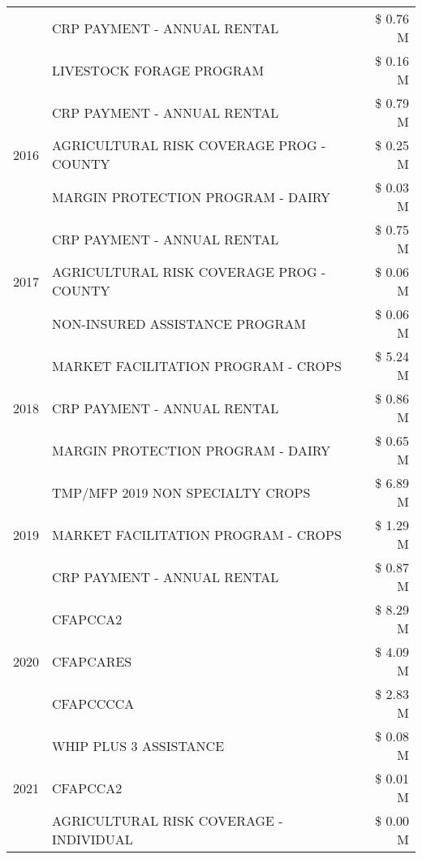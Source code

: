 \begin{tabular}{llr}
 & CRP PAYMENT - ANNUAL RENTAL & \$ 0.76 M \\
 & LIVESTOCK FORAGE PROGRAM & \$ 0.16 M \\
\cline{1-3}
\multirow[t]{3}{*}{2016} & CRP PAYMENT - ANNUAL RENTAL & \$ 0.79 M \\
 & AGRICULTURAL RISK COVERAGE PROG - COUNTY & \$ 0.25 M \\
 & MARGIN PROTECTION PROGRAM - DAIRY & \$ 0.03 M \\
\cline{1-3}
\multirow[t]{3}{*}{2017} & CRP PAYMENT - ANNUAL RENTAL & \$ 0.75 M \\
 & AGRICULTURAL RISK COVERAGE PROG - COUNTY & \$ 0.06 M \\
 & NON-INSURED ASSISTANCE PROGRAM & \$ 0.06 M \\
\cline{1-3}
\multirow[t]{3}{*}{2018} & MARKET FACILITATION PROGRAM - CROPS & \$ 5.24 M \\
 & CRP PAYMENT - ANNUAL RENTAL & \$ 0.86 M \\
 & MARGIN PROTECTION PROGRAM - DAIRY & \$ 0.65 M \\
\cline{1-3}
\multirow[t]{3}{*}{2019} & TMP/MFP 2019 NON SPECIALTY CROPS & \$ 6.89 M \\
 & MARKET FACILITATION PROGRAM - CROPS & \$ 1.29 M \\
 & CRP PAYMENT - ANNUAL RENTAL & \$ 0.87 M \\
\cline{1-3}
\multirow[t]{3}{*}{2020} & CFAPCCA2 & \$ 8.29 M \\
 & CFAPCARES & \$ 4.09 M \\
 & CFAPCCCCA & \$ 2.83 M \\
\cline{1-3}
\multirow[t]{3}{*}{2021} & WHIP PLUS 3 ASSISTANCE & \$ 0.08 M \\
 & CFAPCCA2 & \$ 0.01 M \\
 & AGRICULTURAL RISK COVERAGE - INDIVIDUAL & \$ 0.00 M \\
\cline{1-3}
\bottomrule
\end{tabular}
